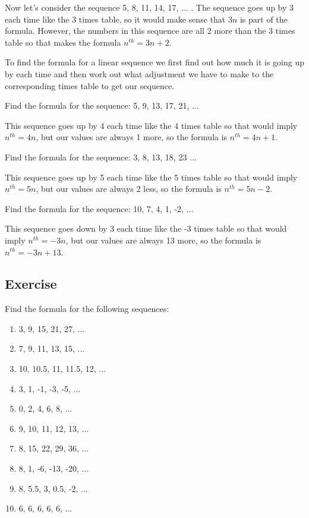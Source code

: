 Now let's consider the sequence 5, 8, 11, 14, 17, ... .  The sequence goes up by 3 each time like the 3 times table, so it would make sense that $3n$ is part of the formula.  However, the numbers in this sequence are all 2 more than the 3 times table so that makes the formula $n^{th}=3n+2$.

\bigskip

To find the formula for a linear sequence we first find out how much it is going up by each time and then work out what adjustment we have to make to the corresponding times table to get our sequence.

\begin{exmp}
Find the formula for the sequence: 5, 9, 13, 17, 21, ...

\bigskip

This sequence goes up by 4 each time like the 4 times table so that would imply $n^{th}=4n$, but our values are always 1 more, so the formula is $n^{th}=4n+1$.
\end{exmp}

\begin{exmp}
Find the formula for the sequence: 3, 8, 13, 18, 23 ...

\bigskip

This sequence goes up by 5 each time like the 5 times table so that would imply $n^{th}=5n$, but our values are always 2 less, so the formula is $n^{th}=5n-2$.
\end{exmp}

\begin{exmp}
Find the formula for the sequence: 10, 7, 4, 1, -2, ...

\bigskip

This sequence goes down by 3 each time like the -3 times table so that would imply $n^{th}=-3n$, but our values are always 13 more, so the formula is $n^{th}=-3n+13$.
\end{exmp}
\subsection{Exercise}
Find the formula for the following sequences:
\begin{enumerate}
	\item 3, 9, 15, 21, 27, ...
	\item 7, 9, 11, 13, 15, ...
	\item 10, 10.5, 11, 11.5, 12, ...
	\item 3, 1, -1, -3, -5, ...
	\item 0, 2, 4, 6, 8, ...
	\item 9, 10, 11, 12, 13, ...
	\item 8, 15, 22, 29, 36, ...
	\item 8, 1, -6, -13, -20, ...
	\item 8, 5.5, 3, 0.5, -2, ...
	\item 6, 6, 6, 6, 6, ...
\end{enumerate}
